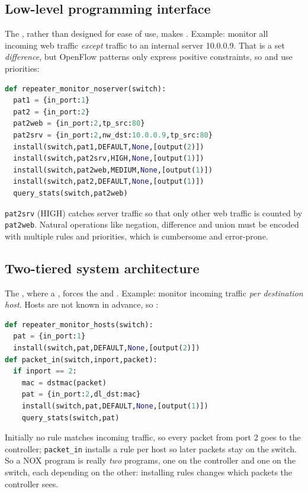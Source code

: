 \subsection{Low-level programming interface}
The ,  rather than designed for ease of use, makes . Example: monitor all incoming web traffic \emph{except} traffic to an internal server 10.0.0.9. That is a set \emph{difference}, but OpenFlow patterns only express positive constraints, so  and use priorities:
\begin{lstlisting}[language=Python]
def repeater_monitor_noserver(switch):
  pat1 = {in_port:1}
  pat2 = {in_port:2}
  pat2web = {in_port:2,tp_src:80}
  pat2srv = {in_port:2,nw_dst:10.0.0.9,tp_src:80}
  install(switch,pat1,DEFAULT,None,[output(2)])
  install(switch,pat2srv,HIGH,None,[output(1)])
  install(switch,pat2web,MEDIUM,None,[output(1)])
  install(switch,pat2,DEFAULT,None,[output(1)])
  query_stats(switch,pat2web)
\end{lstlisting}
\texttt{pat2srv} (HIGH) catches server traffic so that only other web traffic is counted by \texttt{pat2web}. Natural operations like negation, difference and union must be encoded with multiple rules and priorities, which is cumbersome and error-prone.

\subsection{Two-tiered system architecture}
The , where a , forces the  and . Example: monitor incoming traffic \emph{per destination host}. Hosts are not known in advance, so :
\begin{lstlisting}[language=Python]
def repeater_monitor_hosts(switch):
  pat = {in_port:1}
  install(switch,pat,DEFAULT,None,[output(2)])
def packet_in(switch,inport,packet):
  if inport == 2:
    mac = dstmac(packet)
    pat = {in_port:2,dl_dst:mac}
    install(switch,pat,DEFAULT,None,[output(1)])
    query_stats(switch,pat)
\end{lstlisting}
Initially no rule matches incoming traffic, so every packet from port 2 goes to the controller; \texttt{packet\_in} installs a rule per host so later packets stay on the switch. So a NOX program is really \emph{two} programs, one on the controller and one on the switch, each depending on the other: installing rules changes which packets the controller sees.

